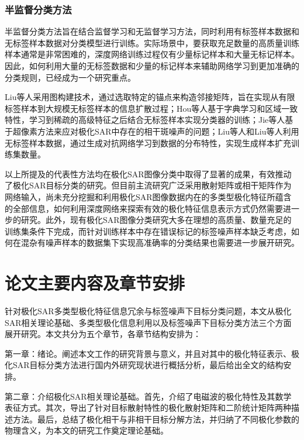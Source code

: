\subsubsection{半监督分类方法}
半监督分类方法旨在结合监督学习和无监督学习方法，同时利用有标签样本数据和无标签样本数据对分类模型进行训练。实际场景中，要获取充足数量的高质量训练样本通常是非常困难的，深度网络训练过程仅有少量标记样本和大量无标记样本。因此，如何利用大量的无标签数据和少量的标记样本来辅助网络学习到更加准确的分类规则，已经成为一个研究重点。

Liu等人采用图构建技术，通过选取特定的锚点来构造邻接矩阵，旨在实现从有限标签样本到大规模无标签样本的信息扩散过程；Hou等人基于字典学习和区域一致特性，学习到稀疏的高级特征之后结合无标签样本实现分类器的训练；Jie等人基于超像素方法来应对极化SAR中存在的相干斑噪声的问题；Liu等人和Liu等人利用无标签样本数据，通过生成对抗网络学习到数据的分布特性，实现生成样本扩充训练集数量。


以上所提及的代表性方法均在极化SAR图像分类中取得了显著的成果，有效推动了极化SAR目标分类的研究。但目前主流研究广泛采用散射矩阵或相干矩阵作为网络输入，尚未充分挖掘和利用极化SAR图像数据内在的多类型极化特征所蕴含的全部信息，如何利用深度网络来探索有效的极化特征信息表示方式仍然需要进一步的研究。此外，现有极化SAR图像分类研究大多在理想的高质量、数量充足的训练集条件下完成，而针对训练样本中存在错误标记的标签噪声样本缺乏考虑，如何在混杂有噪声样本的数据集下实现高准确率的分类结果也需要进一步展开研究。

\section{论文主要内容及章节安排}
针对极化SAR多类型极化特征信息冗余与标签噪声下目标分类问题，本文从极化SAR相关理论基础、多类型极化信息利用以及标签噪声下目标分类方法三个方面展开研究。本文共分为五个章节，各章节结构安排为：

第一章：绪论。阐述本文工作的研究背景与意义，并且对其中的极化特征表示、极化SAR目标分类方法进行国内外研究现状进行概括分析，最后给出全文的结构安排。

第二章：介绍极化SAR相关理论基础。首先，介绍了电磁波的极化特性及其数学表征方式。其次，导出了针对目标散射特性的极化散射矩阵和二阶统计矩阵两种描述方法。最后，总结了极化相干与非相干目标分解方法，并归纳了不同极化参数的物理含义，为本文的研究工作奠定理论基础。

